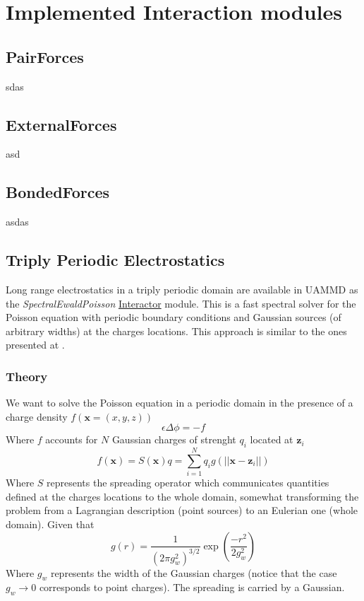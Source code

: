 \documentclass[ twoside,openright,titlepage,numbers=noenddot,%
headinclude,footinclude,cleardoublepage=empty,abstract=on,
BCOR=5mm,paper=a4,fontsize=11pt
]{scrreprt}
\renewcommand{\vec}[1]{\bm{#1}}
\begin{document}
\newpage
\part{Implemented Interaction modules}\label{pt:interactors}
\cleardoublepage
\chapter{PairForces}

sdas


\chapter{ExternalForces}

asd

\chapter{BondedForces}

asdas


\chapter{Triply Periodic Electrostatics} \label{ch:tppoisson}

Long range electrostatics in a triply periodic domain are available in \gls{UAMMD} as the \emph{SpectralEwaldPoisson} \hyperref[sec:interactor]{Interactor} module.  
This is a fast spectral solver for the Poisson equation with periodic boundary conditions and Gaussian sources (of arbitrary widths) at the charges locations. This approach is similar to the ones presented at \cite{sepois1,sepois2, sepois3}.
\section{Theory} \label{sec:tppoisson_theory}
We want to solve the Poisson equation in a periodic domain in the presence of a charge density $f(\vec{x}=(x,y,z))$
\begin{equation}
  \label{eq:ttpoisson}
 \epsilon\Delta\phi=-f
\end{equation}
Where $f$ accounts for $N$ Gaussian charges of strenght $q_i$ located at $\vec{z}_i$ 
\begin{equation}
  \label{eq:tppoisson_cdens}
  f(\vec{x})= S(\vec{x})q = \sum_{i=1}^Nq_ig(||\vec{x}-\vec{z}_i||)
\end{equation}
Where $S$ represents the spreading operator which communicates quantities defined at the charges locations to the whole domain, somewhat transforming the problem from a Lagrangian description (point sources) to an Eulerian one (whole domain). Given that
\begin{equation}
  \label{eq:tpppoisson_gaussiansource}
 g(r)=\frac{1}{\left(2\pi g_w^2\right)^{3/2}}\exp{\left(\frac{-r^2}{2g_w^2}\right)}
\end{equation}
Where $g_w$ represents the width of the Gaussian charges (notice that the case $g_w\rightarrow 0$ corresponds to point charges).
The spreading is carried by a Gaussian.
\end{document}

